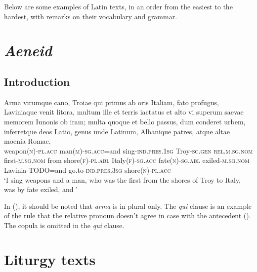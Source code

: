 \documentclass[a4paper, oneside, 12pt]{report}
\newcommand{\form}[1]{\emph{#1}}
\newcommand*{\category}[1]{\textsc{#1}}
\newcommand{\translate}[1]{`#1'}
\newcommand{\literature}[1]{\textit{#1}}
\begin{document}
Below are some examples of Latin texts, 
in an order from the easiest to the hardest,
with remarks on their vocabulary and grammar. 

\section{\literature{Aeneid}}

\subsection{Introduction}



\begin{exe}
    \ex\label{ex:text.aeneid.1.1} \gll Arma virumque cano, Troiae qui primus ab oris
    Italiam, fato profugus, Laviniaque venit litora, 
    multum ille et terris iactatus et alto
    vi superum saevae memorem Iunonis ob iram;
    multa quoque et bello passus, dum conderet urbem,  
    inferretque deos Latio, genus unde Latinum,
    Albanique patres, atque altae moenia Romae. \\
    weapon(\category{n})-\category{pl}.\category{acc} 
    man(\category{m})-\category{sg}.\category{acc}=and 
    sing-\category{ind}.\category{pres}.\category{1sg}
    Troy-\category{sc}.\category{gen} 
    \category{rel}.\category{m}.\category{sg}.\category{nom}
    first-\category{m}.\category{sg}.\category{nom} 
    from shore(\category{f})-\category{pl}.\category{abl} 
    Italy(\category{f})-\category{sg}.\category{acc} 
    fate(\category{n})-\category{sg}.\category{abl} 
    exiled-\category{m}.\category{sg}.\category{nom} 
    Lavinia-TODO=and  
    go.to-\category{ind}.\category{pres}.\category{3sg} 
    shore(\category{n})-\category{pl}.\category{acc} \\
    \glt \translate{I sing weapons and a man, 
    who was the first from the shores of Troy to Italy, 
    was by fate exiled, 
    and }
\end{exe}

In (),
it should be noted that \form{arma} is in plural only.
The \form{qui} clause is an example of the rule 
that the relative pronoun doesn't agree in case 
with the antecedent ().
The copula is omitted in the \form{qui} clause.


\section{Liturgy texts}
\end{document}

